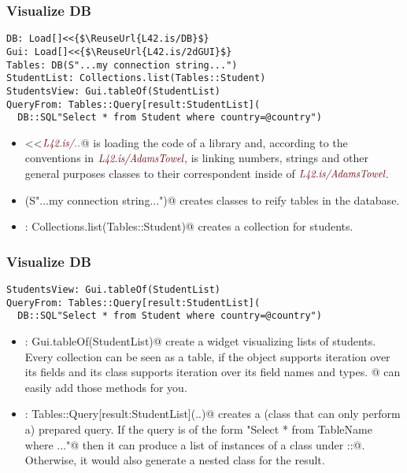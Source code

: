 \begin{frame}[fragile]
\frametitle{Visualize DB}
\begin{NiceCode}{59ex}{1}
\begin{lstlisting}
DB: Load[]<<{$\ReuseUrl{L42.is/DB}$}
Gui: Load[]<<{$\ReuseUrl{L42.is/2dGUI}$}
Tables: DB(S"...my connection string...")
StudentList: Collections.list(Tables::Student)
StudentsView: Gui.tableOf(StudentList)
QueryFrom: Tables::Query[result:StudentList](
  DB::SQL"Select * from Student where country=@country")
\end{lstlisting}
\end{NiceCode}
\begin{itemize}
\item \Q@Load[]<<{$\ReuseUrl{L42.is/..}$}@
\Q@Load@ is loading the code of a library
and, according to the conventions in 
$\ReuseUrl{L42.is/AdamsTowel}$, is linking numbers, strings
and other general purposes classes to their correspondent 
inside of $\ReuseUrl{L42.is/AdamsTowel}$.
\item \Q@DB(S"...my connection string...")@
creates classes to reify tables in the database.
\item \Q@StudentList: Collections.list(Tables::Student)@
creates a collection for students.
\end{itemize}
\end{frame}


\begin{frame}[fragile]
\frametitle{Visualize DB}
\begin{NiceCode}{59ex}{1}
\begin{lstlisting}
StudentsView: Gui.tableOf(StudentList)
QueryFrom: Tables::Query[result:StudentList](
  DB::SQL"Select * from Student where country=@country")
\end{lstlisting}
\end{NiceCode}
\begin{itemize}
\item \Q@StudentsView: Gui.tableOf(StudentList)@
create a widget visualizing lists of students.
Every collection can be seen as a table, if the object supports
iteration over its fields and its class supports iteration over its field names and types.
\Q@Data[]@ can easily add those methods for you.
\item \Q@QueryFrom: Tables::Query[result:StudentList](..)@
creates a (class that can only perform a) prepared query.
If the query is of the form \Q@"Select * from TableName where ..."@ then
it can produce a list of instances of a class under \Q@Table::@.
Otherwise, it would also generate a nested class for the result.
\end{itemize}
\end{frame}

